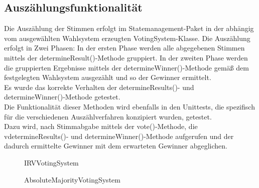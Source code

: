 \documentclass[parskip=full]{scrartcl}
\begin{document}
\subsection{Auszählungsfunktionalität}
Die Auszählung der Stimmen erfolgt im Statemanagement-Paket in der abhängig vom ausgewählten Wahlsystem erzeugten VotingSystem-Klasse.
Die Auszählung erfolgt in Zwei Phasen: In der ersten Phase werden alle abgegebenen Stimmen mittels der determineResult()-Methode gruppiert.
In der zweiten Phase werden die gruppierten Ergebnisse mittels der determineWinner()-Methode gemäß dem festgelegten Wahlsystem ausgezählt und so der Gewinner ermittelt.\\
Es wurde das korrekte Verhalten der determineResults()- und determineWinner()-Methode getestet.\\
Die Funktionalität dieser Methoden wird ebenfalls in den Unittests, die spezifisch für die verschiedenen Auszählverfahren konzipiert wurden, getestet.\\
Dazu wird, nach Stimmabgabe mittels der vote()-Methode, die vdetermineResults()- und determineWinner()-Methode aufgerufen und der dadurch ermittelte Gewinner mit dem erwarteten Gewinner abgeglichen.

\begin{figure}[ht]
	\caption{\label{fig:irv_stat}
		IRVVotingSystem
	}
\end{figure}

\begin{figure}[ht]
	\caption{\label{fig:absmaj_stat}
		AbsoluteMajorityVotingSystem
	}
\end{figure}
\end{document}
